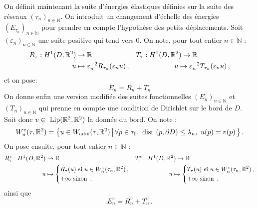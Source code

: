 On définit maintenant la suite d’énergies élastiques définies sur la suite des réseaux
$(\tau_n)_{n \in \mathbb{N}}$. On introduit un changement d’échelle des énergies
$(E_{\tau_n})_{n \in \mathbb{N}}$ pour prendre en compte
l’hypothèse des petits déplacements. Soit $(\varepsilon_n)_{n \in \mathbb{N}}$ une suite
positive qui tend vers $0$. On note, pour tout entier $n \in \mathbb{N}$ :
\begin{align*}
    R_\tau: H^1(D, \mathbb{R}^2) &\rightarrow \mathbb{R}  && T_\tau:
    H^1(D, \mathbb{R}^2 )  \rightarrow \mathbb{R} \\
    u &\mapsto \varepsilon_n^{-2} R_{\tau_n}(\varepsilon_n u)\,,
    && \qquad \qquad \quad \,\, \, u \mapsto \varepsilon_n^{-2} T_{\tau_n}(\varepsilon_n u)\,,
\end{align*}
et on pose: $$ E_n = R_n + T_n $$
On donne enfin une version modifiée des suites fonctionnelles $(E_n)_{n \in \mathbb{N}}$ et $(T_n)
_{n \in \mathbb{N}}$ qui prenne en compte une condition de Dirichlet sur le bord de $D$. Soit donc
$v \in \text{ Lip}(\mathbb{R}^2, \mathbb{R}^2)$ la donnée du bord. On note :
$$
W_n^v(\tau, \mathbb{R}^2) =  \left\{ u\in W_{\text{\upshape adm}}(\tau, \mathbb{R}^2) \, \big| \, \forall p \in \tau_0, \text{
    dist }(p,\partial D) \leq \lambda_n, \, \, u(p) = v(p)\, \right\}.
$$
On pose ensuite, pour tout entier $n \in \mathbb{N}$ :
\begin{align*}
    R_\tau^v: H^1(D, \mathbb{R}^2) &\rightarrow \mathbb{R}  && T_\tau^v:
    H^1(D, \mathbb{R}^2 )  \rightarrow \mathbb{R} \\
    u &\mapsto \begin{dcases}
        R_\tau (u) \text{ si } u \in W_n^v(\tau_n,\mathbb{R}^2) \,, \\
        +\infty \text{ sinon } \,,
    \end{dcases}
    && \qquad \qquad \quad \,\, \, u \mapsto \begin{dcases}
        T_\tau (u) \text{ si } u \in W_n^v(\tau_n,\mathbb{R}^2) \,, \\
        +\infty \text{ sinon } \,,
    \end{dcases}
\end{align*}
ainsi que $$ E_n^v = R_n^v + T_n^v \,. $$

